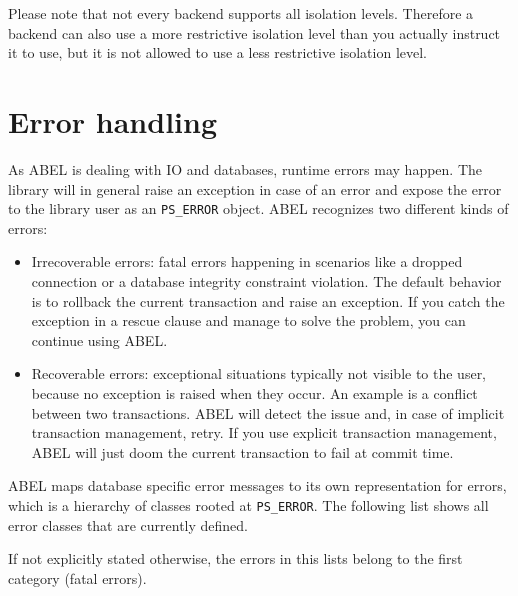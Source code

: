 \documentclass[a4paper,12pt]{report}
\begin{document}
Please note that not every backend supports all isolation levels.
Therefore a backend can also use a more restrictive isolation level than you actually instruct it to use, but it is not allowed to use a less restrictive isolation level.

\chapter{Error handling}

As ABEL is dealing with IO and databases, runtime errors may happen. 
The library will in general raise an exception in case of an error and expose the error to the library user as an \lstinline!PS_ERROR! object.
ABEL recognizes two different kinds of errors:

\begin{itemize}

\item Irrecoverable errors:  fatal errors happening in scenarios like a dropped connection or a database integrity constraint violation.
The default behavior is to rollback the current transaction and raise an exception. 
If you catch the exception in a rescue clause and manage to solve the problem, you can continue using ABEL.

\item Recoverable errors: exceptional situations typically not visible to the user, because no exception is raised when they occur.
An example is a conflict between two transactions.
ABEL will detect the issue and, in case of implicit transaction management, retry.
If you use explicit transaction management, ABEL will just doom the current transaction to fail at commit time.
\end{itemize}

ABEL maps database specific error messages to its own representation for errors, which is a hierarchy of classes rooted at \lstinline!PS_ERROR!.
The following list shows all error classes that are currently defined.

If not explicitly stated otherwise, the errors in this lists belong to the first category (fatal errors).
\end{document}
